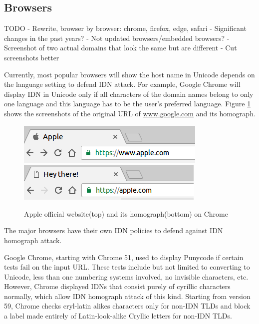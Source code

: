 \documentclass[letterpaper,twocolumn,10pt]{article}
\begin{document}
\subsection{Browsers}
TODO
- Rewrite, browser by browser: chrome, firefox, edge, safari
- Significant changes in the past years?
- Not updated browsers/embedded browsers?
- Screenshot of two actual domains that look the same but are different
- Cut screenshots better

Currently, most popular browsers will show the host name in Unicode depends on the language setting to defend IDN attack.
For example, Google Chrome will display IDN in Unicode only if all characters of the domain names belong to only one language and this language has to be the user's preferred language. Figure \ref{screenshot} shows the screenshots of the original URL of \url{www.google.com} and its homograph.

\begin{figure}[t]
  \includegraphics[width=\linewidth]{images/apple}
  \includegraphics[width=\linewidth]{images/fakeapple-punycode}
  \centering
  \caption{Apple official website(top) and its homograph(bottom) on Chrome}
  \label{screenshot}
\end{figure}

The major browsers have their own IDN policies to defend against IDN homograph attack.

Google Chrome, starting with Chrome 51, used to display Punycode if certain tests fail on the input URL.
These tests include but not limited to converting to Unicode, less than one numbering systems involved, no invisible characters, etc.
However, Chrome displayed IDNs that consist purely of cyrillic characters normally, which allow IDN homograph attack of this kind.
Starting from version 59, Chrome checks cryl-latin alikes characters only for non-IDN TLDs and block a label made entirely of Latin-look-alike Cryllic letters for non-IDN TLDs.
\end{document}
